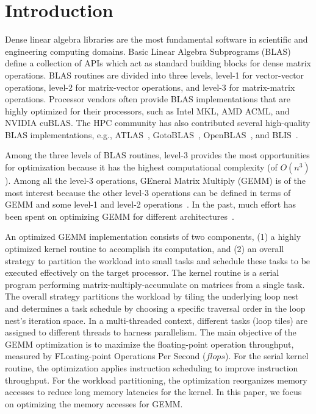 \section{Introduction}\label{sec:intro}
Dense linear algebra libraries are the most fundamental software in
scientific and engineering computing domains.
Basic Linear Algebra Subprograms (BLAS)~\cite{blas}  
define a collection
of APIs which act as standard building blocks for dense matrix operations.
BLAS routines are divided into three levels,
level-1 for vector-vector operations,
level-2 for matrix-vector operations,
and level-3 for matrix-matrix operations.
Processor vendors often provide BLAS implementations
that are highly optimized for their processors,
such as Intel MKL, AMD ACML, and NVIDIA cuBLAS.
The HPC community has also contributed several high-quality
BLAS implementations, e.g., ATLAS~\cite{atlas},
GotoBLAS~\cite{gotoblas}, OpenBLAS~\cite{openblas},
and BLIS~\cite{blis,blisport}.

Among the three levels of BLAS routines, level-3 provides the most opportunities
for optimization because it has the highest computational complexity (of $O(n^3)$).
Among all the level-3 operations, GEneral Matrix Multiply (GEMM) is
of the most interest because the 
other level-3 operations can be defined
in terms of GEMM and some level-1 and level-2 operations~\cite{gemmbased1}.
In the past, much effort has been spent on optimizing GEMM for different
architectures~\cite{Liu2012,Wang2015,Volkov:2008,Cui11,blispar}.

An optimized GEMM implementation consists of two components,
(1) a highly optimized kernel routine to accomplish its
computation, and
(2) an overall strategy to partition the workload into small tasks
and schedule these tasks to be executed effectively on the target processor.
The kernel routine is a serial program performing matrix-multiply-accumulate
on matrices from a single task.
The overall strategy partitions the workload by tiling 
the underlying loop nest
and determines a task schedule by choosing a specific traversal order
in the loop nest's iteration space.
In a multi-threaded context, different tasks (loop tiles) are assigned to
different threads to harness parallelism.
The main objective of the GEMM optimization is to
maximize the floating-point
operation throughput, measured by FLoating-point Operations Per Second ($flops$).
For the serial kernel routine, the optimization applies
instruction scheduling to improve instruction throughput.
For the workload partitioning, the optimization 
reorganizes memory accesses to reduce long memory latencies for
the kernel.
In this paper, we focus on optimizing the memory accesses for GEMM.

